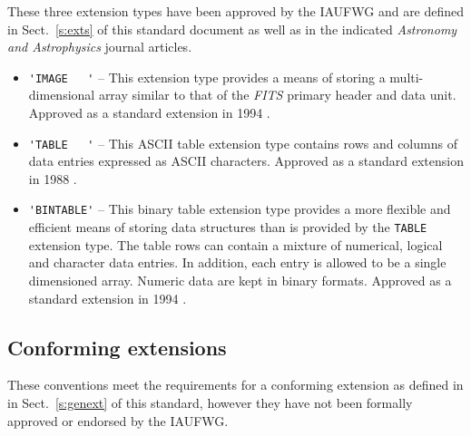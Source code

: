 \documentclass[onecolumn]{aa}
\begin{document}
These three extension types have been approved by the IAUFWG 
and are defined in Sect.\ \ref{s:exts} of this standard document as well as in
the indicated  {\em Astronomy and Astrophysics} journal articles.

\begin{itemize}
\item
\verb*+'IMAGE   '+ -- 
This extension type provides a means of storing a multi-dimensional array
similar to that of the {\em FITS\/} primary header and 
data unit. Approved as a standard extension in 1994 \citep{ponz94}.  


\item
\verb*+'TABLE   '+ --
This ASCII table extension type contains rows and columns of data 
entries expressed as ASCII characters.  Approved as a standard extension
in 1988 \citep{harten88}.  
    
\item
\verb*+'BINTABLE'+ --
This binary table extension type provides a more flexible and efficient means of storing 
data structures than is provided by the 
{\tt TABLE} extension type. The table rows can contain a mixture of numerical, 
logical and character data entries. In addition, each entry is allowed
to be a single dimensioned array.  Numeric data are kept in binary formats.
Approved as a standard extension in 1994 \citep{cotton95}.
\end{itemize}


\subsection{Conforming extensions}  

These conventions meet the requirements for a conforming extension as defined in 
in Sect.\ \ref{s:genext} of this standard, however they have not been  formally
approved or endorsed by the IAUFWG.
\end{document}
